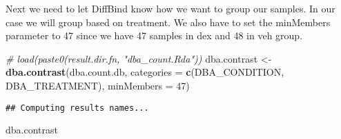 \documentclass[
]{article}
\newenvironment{Shaded}{\begin{snugshade}}{\end{snugshade}}
\newcommand{\CommentTok}[1]{\textcolor[rgb]{0.56,0.35,0.01}{\textit{#1}}}
\newcommand{\DataTypeTok}[1]{\textcolor[rgb]{0.13,0.29,0.53}{#1}}
\newcommand{\DecValTok}[1]{\textcolor[rgb]{0.00,0.00,0.81}{#1}}
\newcommand{\KeywordTok}[1]{\textcolor[rgb]{0.13,0.29,0.53}{\textbf{#1}}}
\newcommand{\NormalTok}[1]{#1}
\newcommand{\StringTok}[1]{\textcolor[rgb]{0.31,0.60,0.02}{#1}}
\begin{document}
Next we need to let DiffBind know how we want to group our samples. In
our case we will group based on treatment. We also have to set the
minMembers parameter to 47 since we have 47 samples in dex and 48 in veh
group.

\begin{Shaded}
\begin{Highlighting}[]
\CommentTok{# load(paste0(result.dir.fn, "dba_count.Rda"))}
\NormalTok{dba.contrast <-}\StringTok{ }\KeywordTok{dba.contrast}\NormalTok{(dba.count.db, }\DataTypeTok{categories =} \KeywordTok{c}\NormalTok{(DBA_CONDITION, DBA_TREATMENT), }\DataTypeTok{minMembers =} \DecValTok{47}\NormalTok{)}
\end{Highlighting}
\end{Shaded}

\begin{verbatim}
## Computing results names...
\end{verbatim}

\begin{Shaded}
\begin{Highlighting}[]
\NormalTok{dba.contrast }
\end{Highlighting}
\end{Shaded}
\end{document}

